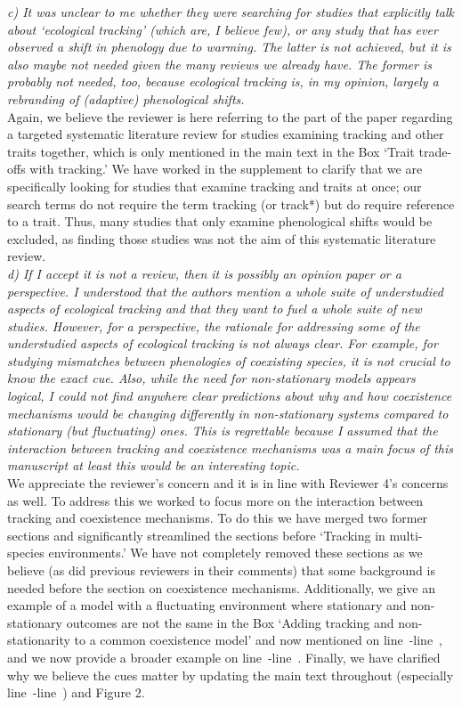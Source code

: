 \documentclass[11pt]{article}
\newcommand{\lr}[1]{line~\lineref{#1}}
\begin{document}
\emph{c) It was unclear to me whether they were searching for studies that explicitly talk about
`ecological tracking' (which are, I believe few), or any study that has ever observed a shift
in phenology due to warming. The latter is not achieved, but it is also maybe not needed
given the many reviews we already have. The former is probably not needed, too, because
ecological tracking is, in my opinion, largely a rebranding of (adaptive) phenological
shifts.}\\

Again, we believe the reviewer is here referring to the part of the paper regarding a targeted systematic literature review for studies examining tracking and other traits together, which is only mentioned in the main text in the Box `Trait trade-offs with tracking.' We have worked in the supplement to clarify that we are specifically looking for studies that examine tracking and traits at once; our search terms do not require the term tracking (or track*) but do require reference to a trait. Thus, many studies that only examine phenological shifts would be excluded, as finding those studies was not the aim of this systematic literature review. \\ 

\emph{d) If I accept it is not a review, then it is possibly an opinion paper or a perspective. I
understood that the authors mention a whole suite of understudied aspects of ecological
tracking and that they want to fuel a whole suite of new studies. However, for a perspective,
the rationale for addressing some of the understudied aspects of ecological tracking is not
always clear. For example, for studying mismatches between phenologies of coexisting species,
it is not crucial to know the exact cue. Also, while the need for non-stationary models
appears logical, I could not find anywhere clear predictions about why and how coexistence
mechanisms would be changing differently in non-stationary systems compared to stationary
(but fluctuating) ones. This is regrettable because I assumed that the interaction between
tracking and coexistence mechanisms was a main focus of this manuscript at least this would
be an interesting topic.}\\

We appreciate the reviewer's concern and it is in line with Reviewer 4's concerns as well. To address this we worked to focus more on the interaction between tracking and coexistence mechanisms. To do this we have merged two former sections and significantly streamlined the sections before `Tracking in multi-species environments.' We have not completely removed these sections as we believe (as did previous reviewers in their comments) that some background is needed before the section on coexistence mechanisms. Additionally, we give an example of a model with a fluctuating environment where stationary and non-stationary outcomes are not the same in the Box `Adding tracking and non-stationarity to a common coexistence model' and now mentioned on \lr{r1dS1}-\lr{r1dE1}, and we now provide a broader example on \lr{r1dS}-\lr{r1dE}. Finally, we have clarified why we believe the cues matter by updating the main text throughout (especially \lr{r3birdsS}-\lr{r3birdsE}) and Figure 2. \\
\end{document}
